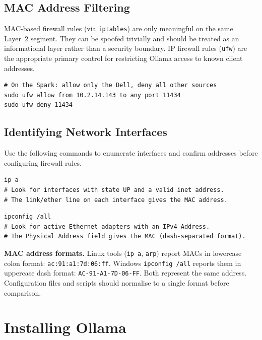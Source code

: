 \subsection{MAC Address Filtering}

MAC-based firewall rules (via \texttt{iptables}) are only meaningful on
the same Layer~2 segment. They can be spoofed trivially and should be
treated as an informational layer rather than a security boundary. IP
firewall rules (\texttt{ufw}) are the appropriate primary control for
restricting Ollama access to known client addresses.

\begin{lstlisting}[style=bashstyle, caption={Restrict Ollama to the Dell's IP only}]
# On the Spark: allow only the Dell, deny all other sources
sudo ufw allow from 10.2.14.143 to any port 11434
sudo ufw deny 11434
\end{lstlisting}

\subsection{Identifying Network Interfaces}

Use the following commands to enumerate interfaces and confirm addresses
before configuring firewall rules.

\begin{lstlisting}[style=bashstyle, caption={Linux: list interfaces and addresses}]
ip a
# Look for interfaces with state UP and a valid inet address.
# The link/ether line on each interface gives the MAC address.
\end{lstlisting}

\begin{lstlisting}[style=psstyle, caption={Windows: list interfaces and addresses}]
ipconfig /all
# Look for active Ethernet adapters with an IPv4 Address.
# The Physical Address field gives the MAC (dash-separated format).
\end{lstlisting}

\begin{infobox}
\textbf{MAC address formats.} Linux tools (\texttt{ip~a},
\texttt{arp}) report MACs in lowercase colon format:
\texttt{ac:91:a1:7d:06:ff}. Windows \texttt{ipconfig~{/}all} reports
them in uppercase dash format: \texttt{AC-91-A1-7D-06-FF}. Both
represent the same address. Configuration files and scripts should
normalise to a single format before comparison.
\end{infobox}

\section{Installing Ollama}
\label{sec:install}

